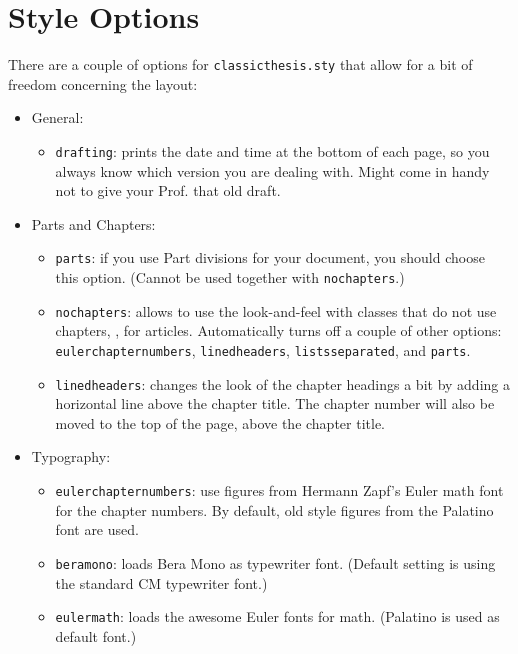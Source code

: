 
\section{Style Options}\label{sec:options}

There are a couple of options for \texttt{classicthesis.sty} that allow for a bit of freedom concerning the layout: 
\begin{itemize}
\item General:
\begin{itemize}
\item\texttt{drafting}: prints the date and time at the bottom of each page, so you always know which version you are dealing with. Might come in handy not to give your Prof. that old draft.
\end{itemize}
	
\item Parts and Chapters:
\begin{itemize}
\item\texttt{parts}: if you use Part divisions for your document, you should choose this option. (Cannot be used together with \texttt{nochapters}.)

\item\texttt{nochapters}: allows to use the look-and-feel with classes that do not use chapters, \eg, for articles. Automatically turns off a couple of other options: \texttt{eulerchapternumbers}, \texttt{linedheaders}, \texttt{listsseparated}, and \texttt{parts}. 

\item\texttt{linedheaders}: changes the look of the chapter headings a bit by adding a horizontal line above the chapter title. The chapter number will also be moved to the top of the page, above the chapter title.
\end{itemize}

\item Typography:
\begin{itemize}
\item\texttt{eulerchapternumbers}: use figures from Hermann Zapf's Euler math font for the chapter numbers. By default, old style figures from the Palatino font are used.

\item\texttt{beramono}: loads Bera Mono as typewriter font. (Default setting is using the standard CM typewriter font.)
\item\texttt{eulermath}: loads the awesome Euler fonts for math. (Palatino is used as default font.)


\end{itemize}
\end{itemize}
